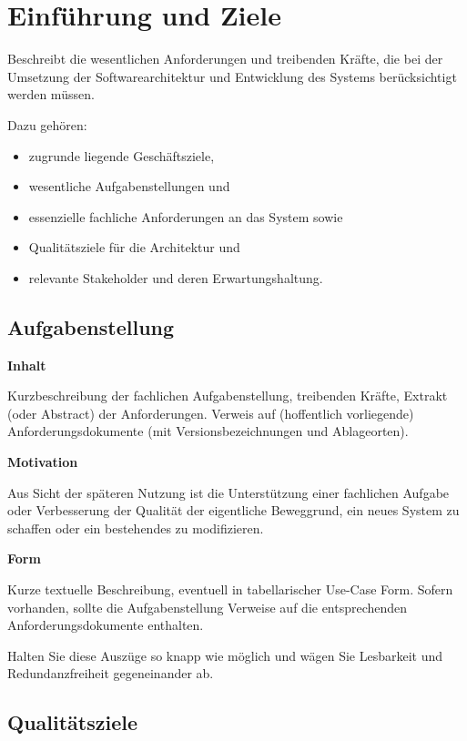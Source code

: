 \hypertarget{einfuxfchrung-und-ziele}{%
\section{Einführung und Ziele}\label{einfuxfchrung-und-ziele}}

Beschreibt die wesentlichen Anforderungen und treibenden Kräfte, die bei
der Umsetzung der Softwarearchitektur und Entwicklung des Systems
berücksichtigt werden müssen.

Dazu gehören:

\begin{itemize}
\tightlist
\item
  zugrunde liegende Geschäftsziele,
\item
  wesentliche Aufgabenstellungen und
\item
  essenzielle fachliche Anforderungen an das System sowie
\item
  Qualitätsziele für die Architektur und
\item
  relevante Stakeholder und deren Erwartungshaltung.
\end{itemize}

\hypertarget{aufgabenstellung}{%
\subsection{Aufgabenstellung}\label{aufgabenstellung}}

\textbf{Inhalt}

Kurzbeschreibung der fachlichen Aufgabenstellung, treibenden Kräfte,
Extrakt (oder Abstract) der Anforderungen. Verweis auf (hoffentlich
vorliegende) Anforderungsdokumente (mit Versionsbezeichnungen und
Ablageorten).

\textbf{Motivation}

Aus Sicht der späteren Nutzung ist die Unterstützung einer fachlichen
Aufgabe oder Verbesserung der Qualität der eigentliche Beweggrund, ein
neues System zu schaffen oder ein bestehendes zu modifizieren.

\textbf{Form}

Kurze textuelle Beschreibung, eventuell in tabellarischer Use-Case Form.
Sofern vorhanden, sollte die Aufgabenstellung Verweise auf die
entsprechenden Anforderungsdokumente enthalten.

Halten Sie diese Auszüge so knapp wie möglich und wägen Sie Lesbarkeit
und Redundanzfreiheit gegeneinander ab.

\hypertarget{qualituxe4tsziele}{%
\subsection{Qualitätsziele}\label{qualituxe4tsziele}}

